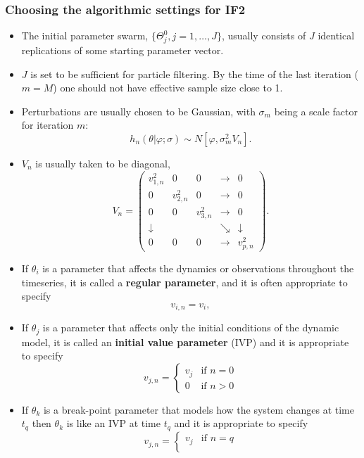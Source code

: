 \documentclass[]{article}
\begin{document}
\subsubsection{Choosing the algorithmic settings for
IF2}\label{choosing-the-algorithmic-settings-for-if2}

\begin{itemize}
\item
  The initial parameter swarm, \(\{ \Theta^0_j, j=1,\dots,J\}\), usually
  consists of \(J\) identical replications of some starting parameter
  vector.
\item
  \(J\) is set to be sufficient for particle filtering. By the time of
  the last iteration (\(m=M\)) one should not have effective sample size
  close to 1.
\item
  Perturbations are usually chosen to be Gaussian, with \(\sigma_m\)
  being a scale factor for iteration \(m\):
  \[h_n(\theta|\varphi;\sigma) \sim N[\varphi, \sigma^2_m V_n].\]
\item
  \(V_n\) is usually taken to be diagonal,
  \[ V_n = \left( \begin{array}{ccccc}
  v_{1,n}^2 & 0 & 0 & \rightarrow & 0 \\
  0 & v_{2,n}^2 &  0 & \rightarrow & 0 \\
  0 & 0 & v_{3,n}^2 & \rightarrow & 0 \\
  \downarrow & & & \searrow & \downarrow \\
  0 & 0 & 0 & \rightarrow & v_{p,n}^2 \end{array}\right).\]
\item
  If \(\theta_i\) is a parameter that affects the dynamics or
  observations throughout the timeseries, it is called a \textbf{regular
  parameter}, and it is often appropriate to specify \[ v_{i,n} = v_i,\]
\item
  If \(\theta_j\) is a parameter that affects only the initial
  conditions of the dynamic model, it is called an \textbf{initial value
  parameter} (IVP) and it is appropriate to specify
  \[ v_{j,n} = \left\{\begin{array}{ll} v_j & \mbox{if $n=0$} \\
  0 & \mbox{if $n>0$} \end{array}\right.\]
\item
  If \(\theta_k\) is a break-point parameter that models how the system
  changes at time \(t_q\) then \(\theta_k\) is like an IVP at time
  \(t_q\) and it is appropriate to specify
  \[ v_{j,n} = \left\{\begin{array}{ll} v_j & \mbox{if $n=q$} \\

\end{array}\]
\end{itemize}
\end{document}
